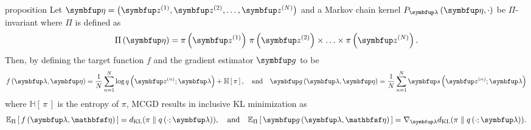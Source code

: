
\begin{theoremEnd}{proposition}\label{thm:product_kernel}
  Let \(\veta = \left( \vz^{(1)}, \vz^{(2)}, \ldots, \vz^{(N)} \right)\) and a Markov chain kernel \(P_{\vlambda}\left(\veta, \cdot\right)\) be \(\Pi\)-invariant where \(\Pi\) is defined as
  {%
  \[
  \Pi\left(\veta\right) = \pi\left(\vz^{(1)}\right) \, \pi\left(\vz^{(2)}\right) \times \ldots \times \pi\left(\vz^{(N)}\right).
  \]
  }
  Then, by defining the target function \(f\) and the gradient estimator \(\vg\) to be 
  {\small
  \begin{align*}
    f\left(\vlambda, \veta\right) =  \frac{1}{N} \sum^{N}_{n=1} \log q\left(\vz^{(n)}; \vlambda\right) + \mathbb{H}\left[\,\pi\,\right], 
    \quad\text{and}\quad
    \vg\left(\vlambda, \veta\right) =  \frac{1}{N} \sum^{N}_{n=1} \vs\left(\vz^{(n)}; \vlambda\right)
  \end{align*}
  }
  where \(\mathbb{H}\left[\,\pi\,\right]\) is the entropy of \(\pi\), MCGD results in inclusive KL minimization as
  {%
  \begin{align*}
    \Esub{\Pi}{ f\left(\vlambda, \rvveta\right) } = \DKL{\pi}{q\left(\cdot; \vlambda\right)},
    \quad\text{and}\quad
    \Esub{\Pi}{ \vg\left(\vlambda, \rvveta\right) } = \nabla_{\vlambda} \DKL{\pi}{q\left(\cdot; \vlambda\right)}.
  \end{align*}
  }
\end{theoremEnd}
